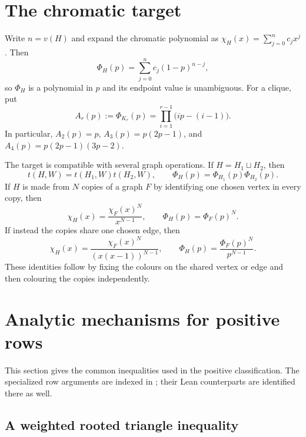 \documentclass[11pt]{article}
\numberwithin{equation}{section}
\theoremstyle{definition}
\theoremstyle{remark}
\begin{document}
\section{The chromatic target}

Write $n=v(H)$ and expand the chromatic polynomial as
$\chi_H(x)=\sum_{j=0}^n c_jx^j$.  Then
\begin{equation}
 \Phi_H(p)=\sum_{j=0}^n c_j(1-p)^{n-j},
 \label{eq:target-polynomial}
\end{equation}
so $\Phi_H$ is a polynomial in $p$ and its endpoint value is unambiguous.
For a clique, put
\begin{equation}
 A_r(p):=\Phi_{K_r}(p)
 =\prod_{i=1}^{r-1}\bigl(ip-(i-1)\bigr).
 \label{eq:clique-target}
\end{equation}
In particular, $A_2(p)=p$, $A_3(p)=p(2p-1)$, and
$A_4(p)=p(2p-1)(3p-2)$.

The target is compatible with several graph operations.  If $H=H_1\sqcup
H_2$, then
\begin{equation}
 t(H,W)=t(H_1,W)t(H_2,W),
 \qquad
 \Phi_H(p)=\Phi_{H_1}(p)\Phi_{H_2}(p).
 \label{eq:component-product}
\end{equation}
If $H$ is made from $N$ copies of a graph $F$ by identifying one chosen
vertex in every copy, then
\begin{equation}
 \chi_H(x)=\frac{\chi_F(x)^N}{x^{N-1}},
 \qquad
 \Phi_H(p)=\Phi_F(p)^N.
 \label{eq:vertex-amalgam-target}
\end{equation}
If instead the copies share one chosen edge, then
\begin{equation}
 \chi_H(x)=\frac{\chi_F(x)^N}{(x(x-1))^{N-1}},
 \qquad
 \Phi_H(p)=\frac{\Phi_F(p)^N}{p^{N-1}}.
 \label{eq:edge-amalgam-target}
\end{equation}
These identities follow by fixing the colours on the shared vertex or edge
and then colouring the copies independently.

\section{Analytic mechanisms for positive rows}

This section gives the common inequalities used in the positive
classification.  The specialized row arguments are indexed in
; their Lean counterparts are identified there as
well.

\subsection{A weighted rooted triangle inequality}
\end{document}
